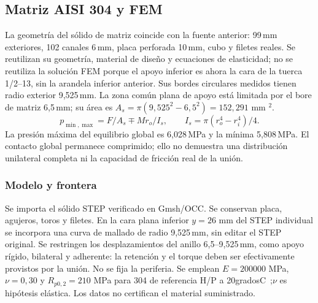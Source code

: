 \subsection{Matriz AISI 304 y FEM}
\label{app:prototipo_A6}
La geometría del sólido de matriz coincide con la fuente anterior:
99\,mm exteriores, 102 canales 6\,mm, placa perforada 10\,mm, cubo y filetes reales.
Se reutilizan su geometría, material de diseño y ecuaciones de elasticidad;
no se reutiliza la solución FEM porque el apoyo inferior es ahora la cara
de la tuerca 1/2--13, sin la arandela inferior anterior.
Sus bordes circulares medidos tienen radio exterior 9,525\,mm. La zona común
plana de apoyo está limitada por el bore de matriz 6,5\,mm; su área es
$A_s=\pi(9,525^2-6,5^2)=152,291$ mm $^2$.
\begin{equation}
 p_{\min,\max}=F/A_s\mp Mr_o/I_s,\qquad
 I_s=\pi(r_o^4-r_i^4)/4.
\end{equation}
La presión máxima del equilibrio global es 6,028\,MPa
y la mínima 5,808\,MPa.
El contacto global permanece comprimido; ello no demuestra una distribución
unilateral completa ni la capacidad de fricción real de la unión.

\subsubsection*{Modelo y frontera}
Se importa el sólido STEP verificado en Gmsh/OCC. Se conservan placa,
agujeros, toros y filetes. En la cara plana inferior $y=26$ mm del STEP
individual se incorpora una curva de mallado de radio 9,525\,mm, sin editar
el STEP original. Se restringen los desplazamientos del anillo 6,5--9,525\,mm,
como apoyo rígido, bilateral y adherente: la retención y el torque deben
ser efectivamente provistos por la unión. No se fija la periferia.
Se emplean $E=200000$ MPa,$\nu=0,30$ y $R_{p0,2}=210$ MPa para 304 de
referencia H/P a 20gradosC~\cite{outokumpu_core_2026};$\nu$ es hipótesis
elástica. Los datos no certifican el material suministrado.

